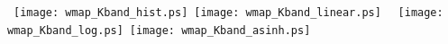 \documentclass[landscape]{report}
\begin{document}
\thispagestyle{empty}
\vbox{
\hbox{
\texttt{[image: wmap\_Kband\_hist.ps]}
\hspace {0.03\textwidth}
\texttt{[image: wmap\_Kband\_linear.ps]}
}
\hbox{
\texttt{[image: wmap\_Kband\_log.ps]}
\hspace {0.03\textwidth}
\texttt{[image: wmap\_Kband\_asinh.ps]}
}
}
\end{document}
